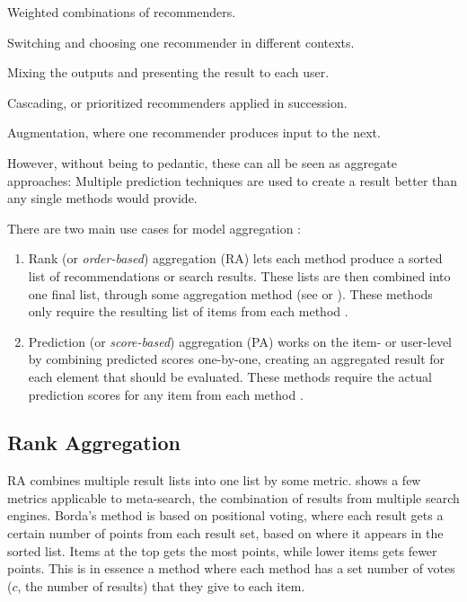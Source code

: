 \begin{itemize*}
  \item Weighted combinations of recommenders.
  \item Switching and choosing one recommender in different contexts.
  \item Mixing the outputs and presenting the result to each user.
  \item Cascading, or prioritized recommenders applied in succession.
  \item Augmentation, where one recommender produces input to the next.
\end{itemize*}

However, without being to pedantic, these can all be seen as aggregate approaches: Multiple prediction techniques are used
to create a result better than any single methods would provide.

There are two main use cases for model aggregation \cite[p1]{Liu2007}: 

\begin{enumerate}
  \item Rank (or \emph{order-based}) aggregation (RA) lets each method
  produce a sorted list of recommendations or search results. These lists are then combined
  into one final list, through some aggregation method (see \cite{Dwork2001} or \cite{Klementiev2008}).
  These methods only require the resulting list of items from each method \cite[p1]{Aslam2001}.

  \item Prediction (or \emph{score-based}) aggregation (PA) works on the item- or user-level by combining predicted scores
  one-by-one, creating an aggregated result for each element that should be evaluated.
  These methods require the actual prediction scores for any item from each method \cite[p2]{Aslam2001}.
\end{enumerate}

\subsection{Rank Aggregation}
\label{sec:theory:rank}

RA combines multiple result lists into one list by some metric.
\cite{Dwork2001} shows a few metrics applicable to meta-search, the combination of results from multiple search engines.
Borda's method \cite[p6]{Dwork2001} is based on positional voting, where each result gets a certain number of points from each result set,
based on where it appears in the sorted list. Items at the top gets the most points, while lower items gets fewer points.
This is in essence a method where each method has a set number of votes ($c$, the number of results) that they give to each item.

